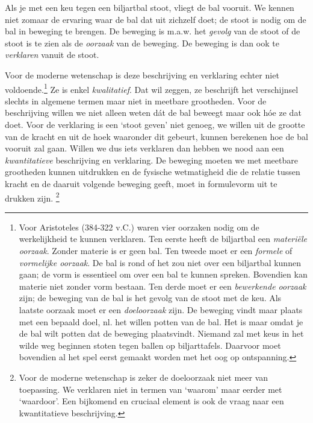 \documentclass{ximera}
\begin{document}
	\author{Bart Lambregs}
    \xmsource\xmuitleg



Als je met een keu tegen een biljartbal stoot, vliegt de bal vooruit. We kennen niet zomaar de ervaring waar de bal dat uit zichzelf doet; de stoot is nodig om de bal in beweging te brengen. De beweging is m.a.w. het \textit{gevolg} van de stoot of de stoot is te zien als de \textit{oorzaak} van de beweging. De beweging is dan ook te \textit{verklaren} vanuit de stoot.

Voor de moderne wetenschap is deze beschrijving en verklaring echter niet voldoende.\footnote{Voor Aristoteles (384-322 v.C.) waren vier oorzaken nodig om de werkelijkheid te kunnen verklaren. Ten eerste heeft de biljartbal een \textit{materiële oorzaak}. Zonder materie is er geen bal. Ten tweede moet er een \textit{formele} of \textit{vormelijke oorzaak}. De bal is rond of het zou niet over een biljartbal kunnen gaan; de vorm is essentieel om over een bal te kunnen spreken. Bovendien kan materie niet zonder vorm bestaan. Ten derde moet er een \textit{bewerkende oorzaak} zijn; de beweging van de bal is het gevolg van de stoot met de keu. Als laatste oorzaak moet er een \textit{doeloorzaak} zijn. De beweging vindt maar plaats met een bepaald doel, nl. het willen potten van de bal. Het is maar omdat je de bal wilt potten dat de beweging plaatsvindt. Niemand zal met keus in het wilde weg beginnen stoten tegen ballen op biljarttafels. Daarvoor moet bovendien al het spel eerst gemaakt worden met het oog op ontspanning.} Ze is enkel \textit{kwalitatief}. Dat wil zeggen, ze beschrijft het verschijnsel slechts in algemene termen maar niet in meetbare grootheden. Voor de beschrijving willen we niet alleen weten d\'at de bal beweegt maar ook h\'oe ze dat doet. Voor de verklaring is een `stoot geven' niet genoeg, we willen uit de grootte van de kracht en uit de hoek waaronder dit gebeurt, kunnen berekenen hoe de bal vooruit zal gaan. Willen we dus iets verklaren dan hebben we nood aan een \textit{kwantitatieve} beschrijving en verklaring. De beweging moeten we met meetbare grootheden kunnen uitdrukken en de fysische wetmatigheid die de relatie tussen kracht en de daaruit volgende beweging geeft, moet in formulevorm uit te drukken zijn.
\footnote{Voor de moderne wetenschap is zeker de doeloorzaak niet meer van toepassing. We verklaren niet in termen van `waarom' maar eerder met `waardoor'. Een bijkomend en cruciaal element is ook de vraag naar een kwantitatieve beschrijving.}
\end{document}
